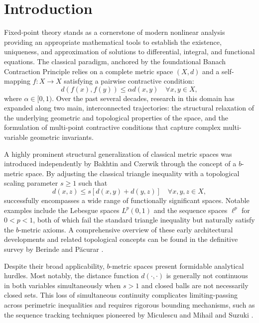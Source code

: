 \documentclass[a4paper,12pt,oneside]{article}
\numberwithin{equation}{section}
\begin{document}
\section{Introduction}
Fixed-point theory stands as a cornerstone of modern nonlinear analysis providing an appropriate mathematical tools to establish the existence, uniqueness, and approximation of solutions to differential, integral, and functional equations. The classical paradigm, anchored by the foundational Banach Contraction Principle relies on a complete metric space $(X,d)$ and a self-mapping $f:X\to X$ satisfying a pairwise contractive condition:
\begin{equation}
d(f(x),f(y))\leq \alpha d(x,y)\quad \forall x,y\in X,
\label{eq:banach}
\end{equation}
where $\alpha \in [0,1)$. Over the past several decades, research in this domain has expanded along two main, interconnected trajectories: the structural relaxation of the underlying geometric and topological properties of the space, and the formulation of multi-point contractive conditions that capture complex multi-variable geometric invariants.

A highly prominent structural generalization of classical metric spaces was introduced independently by Bakhtin \cite{bakhtin1989} and Czerwik \cite{czerwik1993} through the concept of a $b$-metric space. By adjusting the classical triangle inequality with a topological scaling parameter $s \geq 1$ such that
\begin{equation}
d(x,z)\leq s[d(x,y) + d(y,z)]\quad \forall x,y,z\in X,
\label{eq:bmetric_tri}
\end{equation}
 successfully encompasses a wide range of functionally significant spaces. Notable examples include the Lebesgue spaces $L^{p}(0,1)$ and the sequence spaces $\ell^{p}$ for $0< p< 1$, both of which fail the standard triangle inequality but naturally satisfy the $b$-metric axioms. A comprehensive overview of these early architectural developments and related topological concepts can be found in the definitive survey by Berinde and Păcurar \cite{berinde2024}.

Despite their broad applicability, $b$-metric spaces present formidable analytical hurdles. Most notably, the distance function $d(\cdot,\cdot)$ is generally not continuous in both variables simultaneously when $s > 1$ and closed balls are not necessarily closed sets. This loss of simultaneous continuity complicates limiting-passing across perimetric inequalities and requires rigorous bounding mechanisms, such as the sequence tracking techniques pioneered by Miculescu and Mihail \cite{miculescu2017} and Suzuki \cite{suzuki2017}.
\end{document}
